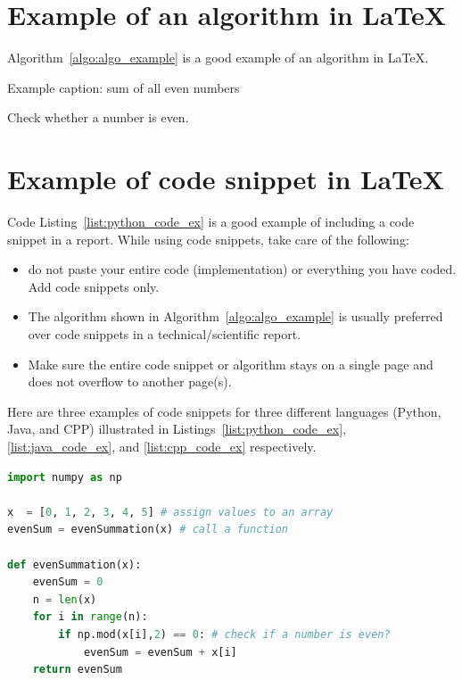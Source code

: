 \section{Example of an algorithm in \LaTeX}
Algorithm~\ref{algo:algo_example} is a good example of an algorithm in \LaTeX.
\begin{algorithm}
  \caption{Example caption: sum of all even numbers}
  \label{algo:algo_example}
  \begin{algorithmic}[1]
    \Statex
      \Comment Check whether a number is even.
    \EndIf
    \EndFor
    \State {}
    \EndFunction
  \end{algorithmic}
\end{algorithm}

\section{Example of code snippet  in \LaTeX}

Code Listing~\ref{list:python_code_ex} is a good example of including
a code snippet in a report. While using code snippets, take care of
the following:
\begin{itemize}
  \item do not paste your entire code (implementation) or everything
    you have coded. Add code snippets only.
  \item The algorithm shown in Algorithm~\ref{algo:algo_example} is
    usually preferred over code snippets in a technical/scientific report.
  \item Make sure the entire code snippet or algorithm stays on a
    single page and does not overflow to another page(s).
\end{itemize}

Here are three examples of code snippets for three different
languages (Python, Java, and CPP) illustrated in
Listings~\ref{list:python_code_ex}, \ref{list:java_code_ex}, and
\ref{list:cpp_code_ex} respectively.

\begin{lstlisting}[language=Python, caption={Code snippet in \LaTeX ~and  this is a Python code example}, label=list:python_code_ex]
import numpy as np

x  = [0, 1, 2, 3, 4, 5] # assign values to an array
evenSum = evenSummation(x) # call a function

def evenSummation(x):
    evenSum = 0
    n = len(x)
    for i in range(n):
        if np.mod(x[i],2) == 0: # check if a number is even?
            evenSum = evenSum + x[i]
    return evenSum
\end{lstlisting}


